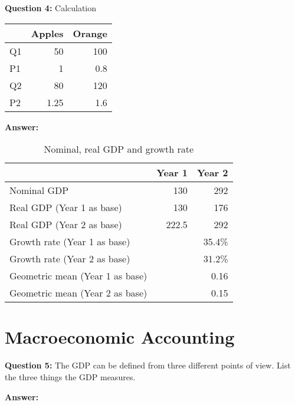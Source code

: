 \documentclass[a4paper, 11pt]{article}
\begin{document}
\textbf{Question 4:} Calculation

\begin{table}[htbp]
  \centering

    \begin{tabular}{lrr}
    \toprule
    \toprule
          & \multicolumn{1}{c}{\textbf{Apples}} & \multicolumn{1}{c}{\textbf{Orange}} \\
    \midrule
    Q1    & 50    & 100 \\
    P1    & 1     & 0.8 \\
    Q2    & 80    & 120 \\
    P2    & 1.25  & 1.6 \\
    \bottomrule
    \end{tabular}%
  \label{tab:addlabel}%
\end{table}%


\textbf{Answer:}
\begin{table}[htbp]
  \centering
  \caption{Nominal, real GDP and growth rate}
    \begin{tabular}{lrr}
    \toprule
    \toprule
          & \multicolumn{1}{c}{\textbf{Year 1}} & \multicolumn{1}{c}{\textbf{Year 2}} \\
    \midrule
    Nominal GDP & 130   & 292 \\
    Real GDP (Year 1 as base) & 130   & 176 \\
    Real GDP (Year 2 as base) & 222.5 & 292 \\
    Growth rate (Year 1 as base) &       & 35.4\% \\
    Growth rate (Year 2 as base) &       & 31.2\% \\
    Geometric mean (Year 1 as base) &       & 0.16 \\
    Geometric mean (Year 2 as base) &       & 0.15 \\
    \bottomrule
    \end{tabular}%

\end{table}%

\section {Macroeconomic Accounting}

\textbf{Question 5:} The GDP can be defined from three different points of view. List the three things the GDP measures.

\textbf{Answer:}
\end{document}
